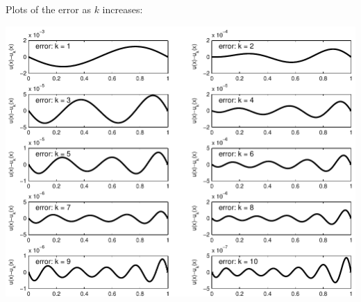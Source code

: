 \begin{solution}
\begin{enumerate}
          Plots of the error as $k$ increases:
          \begin{center}\includegraphics[scale=0.7]{sineseries2f}\end{center}


\end{enumerate}
\end{solution}
